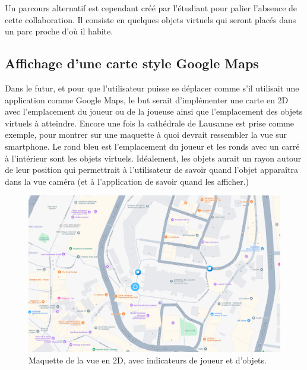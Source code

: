 Un parcours alternatif est cependant créé par l'étudiant pour palier l'absence de
cette collaboration. Il consiste en quelques objets virtuels qui seront placés dans un parc proche d'où il habite.

\subsection{Affichage d'une carte style Google Maps}
Dans le futur, et pour que l'utilisateur puisse se déplacer comme s'il utilisait une application comme
Google Maps, le but serait d'implémenter une carte en 2D avec l'emplacement du joueur ou de la joueuse ainsi que l'emplacement
des objets virtuels à atteindre. Encore une fois la cathédrale de Lausanne est prise comme exemple, pour montrer sur une maquette à quoi
devrait ressembler la vue sur smartphone. Le rond bleu est l'emplacement du joueur et les ronds avec un carré à l'intérieur sont les objets
virtuels. Idéalement, les objets aurait un rayon autour de leur position qui  permettrait à l'utilisateur de savoir quand l'objet apparaîtra dans la vue
caméra (et à l'application de savoir quand les afficher.)

\begin{figure}[H]
    \centering
    \includegraphics[width=1\linewidth]{assets/figures/Screenshots/Maps.png}
    \caption{Maquette de la vue en 2D, avec indicateurs de joueur et d'objets.}
    \label{fig:Maps}
\end{figure}


